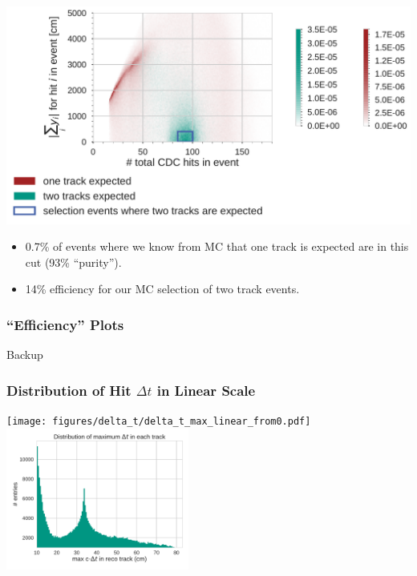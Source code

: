 \documentclass[18pt]{beamer}
\begin{document}
\begin{frame}
  \begin{center}
    \includegraphics[width=1.0\textwidth]{figures/mcsplit_analysis/sum_y_vs_hits_merged.pdf}
  \end{center}
  \begin{itemize}
  \item 0.7\% of events where we know from MC that one track is expected are in this cut (93\% ``purity'').\\
  \item 14\% efficiency for our MC selection of two track events.
  \end{itemize}
\end{frame}

\begin{frame}
  \frametitle{``Efficiency'' Plots}
  
\end{frame}


\appendix
\backupbegin

\begin{frame}
  \begin{center}
    \huge Backup
  \end{center}
\end{frame}

\begin{frame}
  \frametitle{Distribution of Hit $\Delta t$ in Linear Scale}  
    \begin{center}
      \texttt{[image: figures/delta\_t/delta\_t\_max\_linear\_from0.pdf]}
      \includegraphics[width=0.45\textwidth]{figures/delta_t/delta_t_max_linear.pdf}
  \end{center}
\end{frame}
\end{document}
